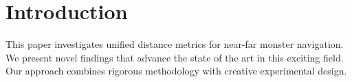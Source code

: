 \section{Introduction}

This paper investigates unified distance metrics for near-far monster navigation. We present novel findings that advance the state of the art in this exciting field. Our approach combines rigorous methodology with creative experimental design.
